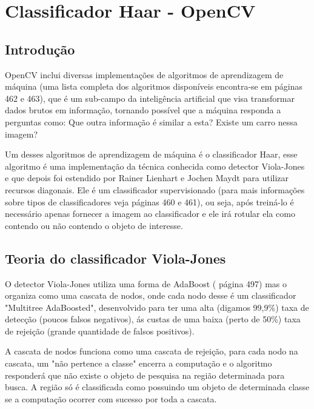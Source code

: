 \section{Classificador Haar - OpenCV}


\subsection{Introdução}

OpenCV inclui diversas implementações de algoritmos de aprendizagem de máquina (uma lista completa dos algoritmos disponíveis encontra-se em \cite{learningOpenCV} páginas 462 e 463), que é um sub-campo da inteligência artificial que visa transformar dados brutos em informação, tornando possível que a máquina responda a perguntas como: Que outra informação é similar a esta? Existe um carro nessa imagem?

Um desses algoritmos de aprendizagem de máquina é o classificador Haar, esse algoritmo é uma implementação da técnica conhecida como detector Viola-Jones \cite{rapidObjectDetectionViola01} e que depois foi estendido por Rainer Lienhart e Jochen Maydt \cite{extendedSetHaarFeatures02} para utilizar recursos diagonais. Ele é um classificador supervisionado (para mais informações sobre tipos de classificadores veja \cite{learningOpenCV} páginas 460 e 461), ou seja, após treiná-lo é necessário apenas fornecer a imagem ao classificador e ele irá rotular ela como contendo ou não contendo o objeto de interesse.


\subsection{Teoria do classificador Viola-Jones}

O detector Viola-Jones utiliza uma forma de AdaBoost (\cite{learningOpenCV} página 497) mas o organiza como uma cascata de nodos, onde cada nodo desse é um classificador "Multitree AdaBoosted", desenvolvido para ter uma alta (digamos 99,9\%) taxa de detecção (poucos falsos negativos), ás custas de uma baixa (perto de 50\%) taxa de rejeição (grande quantidade de falsos positivos).

A cascata de nodos funciona como uma cascata de rejeição, para cada nodo na cascata, um "não pertence a classe" encerra a computação e o algoritmo responderá que não existe o objeto de pesquisa na região determinada para busca.  A região só é classificada como possuindo um objeto de determinada classe se a computação ocorrer com sucesso por toda a cascata. 

